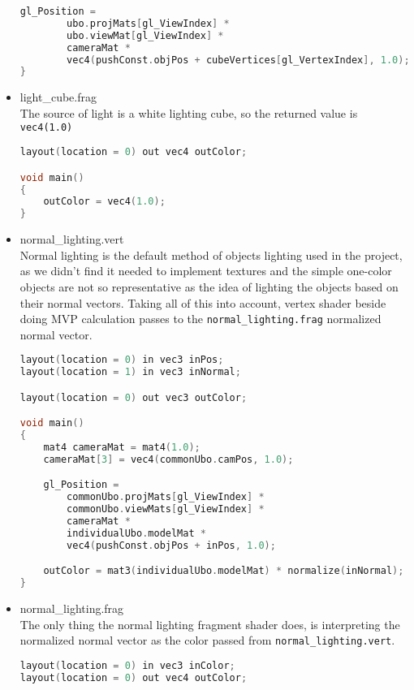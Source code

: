 \begin{itemize}
\begin{lstlisting}[language=c++, caption=Light cube vertex shader (./assets/shaders/light\_cube.vert)]
    gl_Position =
        ubo.projMats[gl_ViewIndex] *
        ubo.viewMat[gl_ViewIndex] *
        cameraMat *
        vec4(pushConst.objPos + cubeVertices[gl_VertexIndex], 1.0);
}
\end{lstlisting}
    \item light\_cube.frag\\
    The source of light is a white lighting cube, so the returned value is \texttt{vec4(1.0)}
\begin{lstlisting}[language=c++, caption=Light cube fragment shader (./assets/shaders/light\_cube.frag)]
layout(location = 0) out vec4 outColor;

void main()
{
    outColor = vec4(1.0);
}
\end{lstlisting}
    \item normal\_lighting.vert\\
    \label{vert_normal_light}
    Normal lighting is the default method of objects lighting used in the project, as we didn't find it needed to implement textures and the simple one-color objects are not so representative as the idea of lighting the objects based on their normal vectors. Taking all of this into account, vertex shader beside doing MVP calculation passes to the \texttt{normal\_lighting.frag} normalized normal vector.
\begin{lstlisting}[language=c++, caption=Normal lighting vertex shader (./assets/shaders/normal\_lighting.vert)]
layout(location = 0) in vec3 inPos;
layout(location = 1) in vec3 inNormal;

layout(location = 0) out vec3 outColor;

void main()
{
    mat4 cameraMat = mat4(1.0);
    cameraMat[3] = vec4(commonUbo.camPos, 1.0);

    gl_Position =
        commonUbo.projMats[gl_ViewIndex] *
        commonUbo.viewMats[gl_ViewIndex] *
        cameraMat *
        individualUbo.modelMat *
        vec4(pushConst.objPos + inPos, 1.0);

    outColor = mat3(individualUbo.modelMat) * normalize(inNormal);
}
\end{lstlisting}
    \item normal\_lighting.frag\\
    The only thing the normal lighting fragment shader does, is interpreting the normalized normal vector as the color passed from \texttt{normal\_lighting.vert}.
    \label{frag_normal_light}
\begin{lstlisting}[language=c++, caption=Normal lighting fragment shader (./assets/shaders/normal\_lighting.frag)]
layout(location = 0) in vec3 inColor;
layout(location = 0) out vec4 outColor;


\end{lstlisting}
\end{itemize}
